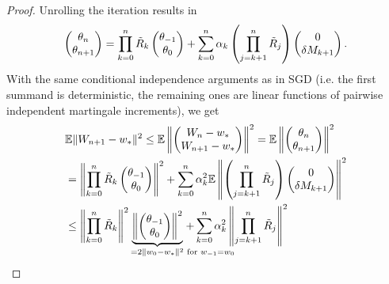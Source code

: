 \begin{proof}
	Unrolling the iteration results in
	\begin{align*}
		\begin{pmatrix}
			\theta_n \\
			\theta_{n+1}
		\end{pmatrix}
		= \prod_{k=0}^n \tilde{R}_k
		\begin{pmatrix}
			\theta_{-1}\\
			\theta_0
		\end{pmatrix}
		+ \sum_{k=0}^n \alpha_k\left(\prod_{j=k+1}^n \tilde{R}_j\right)
		\begin{pmatrix}
			0\\
			\delta M_{k+1}
		\end{pmatrix}.
	\end{align*}
	With the same conditional independence arguments as in SGD (i.e. the first
	summand is deterministic, the remaining ones are linear functions of pairwise
	independent martingale increments), we get
	\begin{align}
		\nonumber
		&\E\|\Weights_{n+1} - \minimum\|^2
		\le \E\left\|\begin{pmatrix}
			\Weights_n - \minimum \\
			\Weights_{n+1} - \minimum
		\end{pmatrix}\right\|^2
		=\E\left\|\begin{pmatrix}
			\theta_n \\
			\theta_{n+1}
		\end{pmatrix}\right\|^2\\
		\nonumber
		&= \left\|\prod_{k=0}^n \tilde{\momMatrix}_k
		\begin{pmatrix}
			\theta_{-1}\\
			\theta_0
		\end{pmatrix}\right\|^2
		+ \sum_{k=0}^n \lrSq_k^2 \E\left\|\left(\prod_{j=k+1}^n \tilde{\momMatrix}_j\right)
		\begin{pmatrix}
			0\\
			\martIncr_{k+1}
		\end{pmatrix}\right\|^2\\
		\label{eq: mom recursion upper bound}
		&\le \left\|\prod_{k=0}^n \tilde{\momMatrix}_k\right\|^2
		\underbrace{\left\|\begin{pmatrix}
			\theta_{-1}\\
			\theta_0
		\end{pmatrix}\right\|^2}_{=2\|\weights_0-\minimum\|^2 \mathrlap{\text{ for } \weights_{-1}=\weights_0}}
		+ \sum_{k=0}^n \lrSq_k^2 \left\|\prod_{j=k+1}^n \tilde{\momMatrix}_j\right\|^2

\end{align}
\end{proof}
